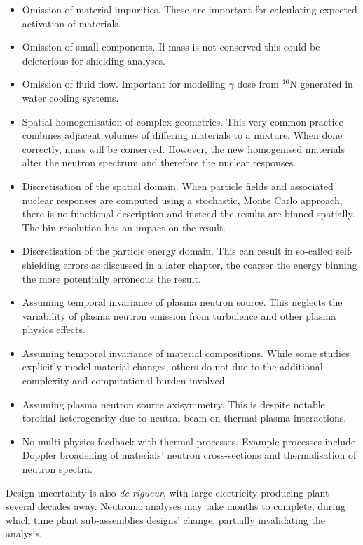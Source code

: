 \begin{itemize}
\item Omission of material impurities. These are important for calculating expected activation of materials.
\item Omission of small components. If mass is not conserved this could be deleterious for shielding analyses.
\item Omission of fluid flow. Important for modelling $\gamma$ dose from $^{16}$N generated in water cooling systems.
\item Spatial homogenisation of complex geometries. This very common practice combines adjacent volumes of differing materials to a mixture. When done correctly, mass will be conserved. However, the new homogenised materials alter the neutron spectrum and therefore the nuclear responses.
\item Discretisation of the spatial domain. When particle fields and associated nuclear responses are computed using a stochastic, Monte Carlo approach, there is no functional description and instead the results are binned spatially. The bin resolution has an impact on the result. 
\item Discretisation of the particle energy domain. This can result in so-called self-shielding errors as discussed in a later chapter, the coarser the energy binning the more potentially erroneous the result.
\item Assuming temporal invariance of plasma neutron source. This neglects the variability of plasma neutron emission from turbulence and other plasma physics effects.
\item Assuming temporal invariance of material compositions. While some studies explicitly model material changes, others do not due to the additional complexity and computational burden involved.
\item Assuming plasma neutron source axisymmetry. This is despite notable toroidal heterogeneity due to neutral beam on thermal plasma interactions.
\item No multi-physics feedback with thermal processes. Example processes include Doppler broadening of materials' neutron cross-sections and thermalisation of neutron spectra.
\end{itemize}

Design uncertainty is also \textit{de rigueur}, with large electricity producing plant several decades away. Neutronic analyses may take months to complete, during which time plant sub-assemblies designs' change, partially invalidating the analysis. 

